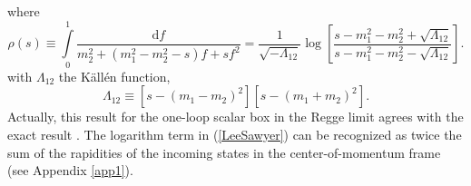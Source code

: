 where
\begin{equation}
	\rho(s) \equiv \int\limits_{0}^{1} \frac{\mathrm{d}f}{m_{2}^{2} + (m_{1}^{2} - m_{2}^{2} - s)f + s f^{2}} = \frac{1}{\sqrt{-\Lambda_{12}}} \log{\left[ \frac{s - m_{1}^{2} - m_{2}^{2} + \sqrt{\Lambda_{12}}}{s - m_{1}^{2} - m_{2}^{2} - \sqrt{\Lambda_{12}}} \right]}.
	\label{LeeSawyer}
\end{equation}
with $\Lambda_{12}$ the K\"{a}ll\'{e}n function,
\begin{equation}
	\Lambda_{12} \equiv [s - (m_{1} - m_{2})^{2}][s - (m_{1} + m_{2})^{2}].
\end{equation}
Actually, this result for the one-loop scalar box in the Regge limit agrees with the exact result \cite{PvN,tHVelt}. The logarithm term in (\ref{LeeSawyer}) can be recognized as twice the sum of the rapidities of the incoming states in the center-of-momentum frame (see Appendix \ref{app1}).

